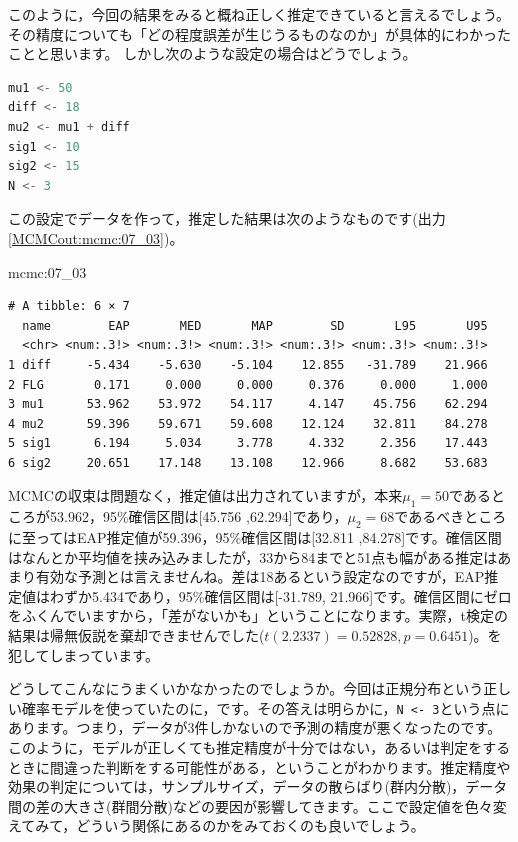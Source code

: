 \documentclass{ltjsbook}
\begin{document}
このように，今回の結果をみると概ね正しく推定できていると言えるでしょう。その精度についても「どの程度誤差が生じうるものなのか」が具体的にわかったことと思います。
しかし次のような設定の場合はどうでしょう。
\begin{lstlisting}[language=c++,label={code:07_07},caption={仮想データの生成その2}]
mu1 <- 50
diff <- 18
mu2 <- mu1 + diff
sig1 <- 10
sig2 <- 15
N <- 3
\end{lstlisting}
この設定でデータを作って，推定した結果は次のようなものです(出力\ref{MCMCout:mcmc:07_03})。
\begin{MCMCout}{}{mcmc:07_03}
	\begin{verbatim}
# A tibble: 6 × 7
  name        EAP       MED       MAP        SD       L95       U95
  <chr> <num:.3!> <num:.3!> <num:.3!> <num:.3!> <num:.3!> <num:.3!>
1 diff     -5.434    -5.630    -5.104    12.855   -31.789    21.966
2 FLG       0.171     0.000     0.000     0.376     0.000     1.000
3 mu1      53.962    53.972    54.117     4.147    45.756    62.294
4 mu2      59.396    59.671    59.608    12.124    32.811    84.278
5 sig1      6.194     5.034     3.778     4.332     2.356    17.443
6 sig2     20.651    17.148    13.108    12.966     8.682    53.683
\end{verbatim}
\end{MCMCout}
MCMCの収束は問題なく，推定値は出力されていますが，本来$\mu_1=50$であるところが53.962，95\%確信区間は[45.756 ,62.294]であり，$\mu_2=68$であるべきところに至ってはEAP推定値が59.396，95\%確信区間は[32.811 ,84.278]です。確信区間はなんとか平均値を挟み込みましたが，33から84までと51点も幅がある推定はあまり有効な予測とは言えませんね。差は18あるという設定なのですが，EAP推定値はわずか5.434であり，95\%確信区間は[-31.789, 21.966]です。確信区間にゼロをふくんでいますから，「差がないかも」ということになります。実際，t検定の結果は帰無仮説を棄却できませんでした($t(2.2337)=0.52828,p=0.6451$)。を犯してしまっています。

どうしてこんなにうまくいかなかったのでしょうか。今回は正規分布という正しい確率モデルを使っていたのに，です。その答えは明らかに，\verb|N <- 3|という点にあります。つまり，データが3件しかないので予測の精度が悪くなったのです。
このように，モデルが正しくても推定精度が十分ではない，あるいは判定をするときに間違った判断をする可能性がある，ということがわかります。推定精度や効果の判定については，サンプルサイズ，データの散らばり(群内分散)，データ間の差の大きさ(群間分散)などの要因が影響してきます。ここで設定値を色々変えてみて，どういう関係にあるのかをみておくのも良いでしょう。
\end{document}
